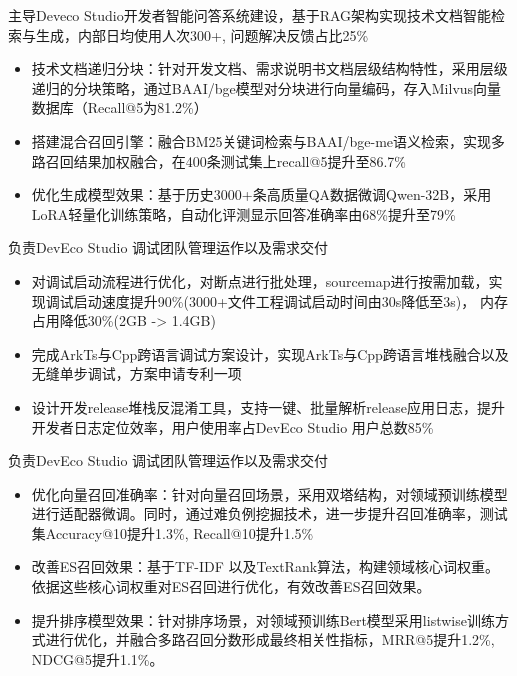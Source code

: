 \documentclass{resume}
\begin{document}
\begin{onehalfspacing}
主导Deveco Studio开发者智能问答系统建设，基于RAG架构实现技术文档智能检索与生成，内部日均使用人次300+, 问题解决反馈占比25\%
\begin{itemize}
  \item 技术文档递归分块：针对开发文档、需求说明书文档层级结构特性，采用层级递归的分块策略，通过BAAI/bge模型对分块进行向量编码，存入Milvus向量数据库（Recall@5为81.2\%）
  \item 搭建混合召回引擎：融合BM25关键词检索与BAAI/bge-me语义检索，实现多路召回结果加权融合，在400条测试集上recall@5提升至86.7\%
  \item 优化生成模型效果：基于历史3000+条高质量QA数据微调Qwen-32B，采用LoRA轻量化训练策略，自动化评测显示回答准确率由68\%提升至79\%
\end{itemize}

\begin{onehalfspacing}
负责DevEco Studio 调试团队管理运作以及需求交付
\begin{itemize}
  \item 对调试启动流程进行优化，对断点进行批处理，sourcemap进行按需加载，实现调试启动速度提升90\%(3000+文件工程调试启动时间由30s降低至3s)， 内存占用降低30\%(2GB -> 1.4GB)
  \item 完成ArkTs与Cpp跨语言调试方案设计，实现ArkTs与Cpp跨语言堆栈融合以及无缝单步调试，方案申请专利一项
  \item 设计开发release堆栈反混淆工具，支持一键、批量解析release应用日志，提升开发者日志定位效率，用户使用率占DevEco Studio 用户总数85\%
\end{itemize}
\end{onehalfspacing}

\begin{onehalfspacing}
负责DevEco Studio 调试团队管理运作以及需求交付
\begin{itemize}
  \item 优化向量召回准确率：针对向量召回场景，采用双塔结构，对领域预训练模型进行适配器微调。同时，通过难负例挖掘技术，进一步提升召回准确率，测试集Accuracy@10提升1.3\%, Recall@10提升1.5\%
  \item 改善ES召回效果：基于TF-IDF 以及TextRank算法，构建领域核心词权重。依据这些核心词权重对ES召回进行优化，有效改善ES召回效果。
  \item 提升排序模型效果：针对排序场景，对领域预训练Bert模型采用listwise训练方式进行优化，并融合多路召回分数形成最终相关性指标，MRR@5提升1.2\%, NDCG@5提升1.1\%。
\end{itemize}
\end{onehalfspacing}


\end{onehalfspacing}
\end{document}
